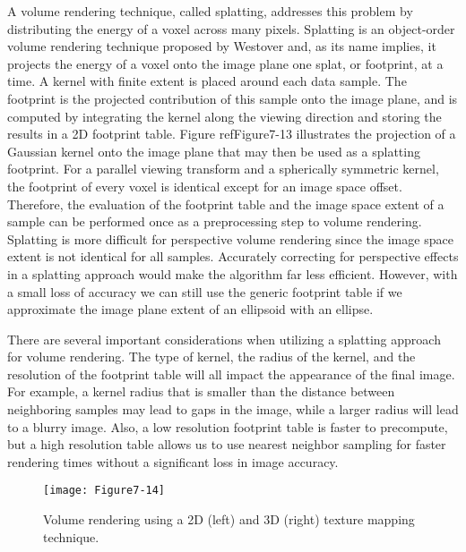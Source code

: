 A volume rendering technique, called splatting, addresses this problem by distributing the energy of a voxel across many pixels. Splatting is an object-order volume rendering technique proposed by Westover \cite{Westover90} and, as its name implies, it projects the energy of a voxel onto the image plane one splat, or footprint, at a time. A kernel with finite extent is placed around each data sample. The footprint is the projected contribution of this sample onto the image plane, and is computed by integrating the kernel along the viewing direction and storing the results in a 2D footprint table. Figure ref{Figure7-13} illustrates the projection of a Gaussian kernel onto the image plane that may then be used as a splatting footprint. For a parallel viewing transform and a spherically symmetric kernel, the footprint of every voxel is identical except for an image space offset. Therefore, the evaluation of the footprint table and the image space extent of a sample can be performed once as a preprocessing step to volume rendering. Splatting is more difficult for perspective volume rendering since the image space extent is not identical for all samples. Accurately correcting for perspective effects in a splatting approach would make the algorithm far less efficient. However, with a small loss of accuracy we can still use the generic footprint table if we approximate the image plane extent of an ellipsoid with an ellipse.

There are several important considerations when utilizing a splatting approach for volume rendering. The type of kernel, the radius of the kernel, and the resolution of the footprint table will all impact the appearance of the final image. For example, a kernel radius that is smaller than the distance between neighboring samples may lead to gaps in the image, while a larger radius will lead to a blurry image. Also, a low resolution footprint table is faster to precompute, but a high resolution table allows us to use nearest neighbor sampling for faster rendering times without a significant loss in image accuracy.

\begin{figure}[!htb]
	\texttt{[image: Figure7-14]}
	\caption{Volume rendering using a 2D (left) and 3D (right) texture mapping technique.}\label{fig:Figure7-14}
\end{figure}

